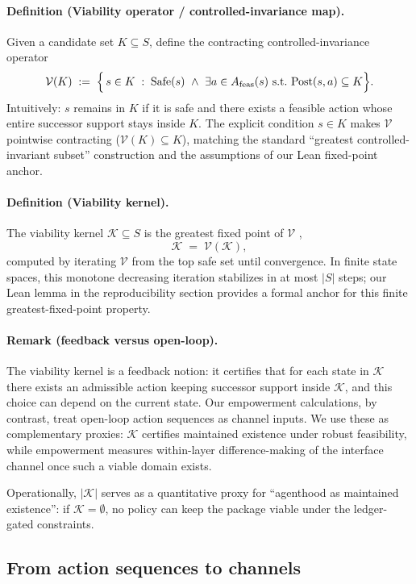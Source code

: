 \documentclass[11pt]{article}
\newcommand{\K}{\mathcal{K}}
\begin{document}
\paragraph{Definition (Viability operator / controlled-invariance map).}
Given a candidate set $K\subseteq S$, define the contracting controlled-invariance operator
\[
\mathcal{V}(K) \;:=\; \Bigl\{\, s\in K \;:\; \mathrm{Safe}(s)\ \wedge\ \exists a\in A_{\mathrm{feas}}(s)\ \text{s.t.}\ \mathrm{Post}(s,a)\subseteq K \Bigr\}.
\]
Intuitively: $s$ remains in $K$ if it is safe and there exists a feasible action whose entire successor support stays inside $K$. The explicit condition $s\in K$ makes $\mathcal{V}$ pointwise contracting ($\mathcal{V}(K)\subseteq K$), matching the standard ``greatest controlled-invariant subset'' construction and the assumptions of our Lean fixed-point anchor.

\paragraph{Definition (Viability kernel).}
The viability kernel $\K\subseteq S$ is the greatest fixed point of $\mathcal{V}$ \citep{aubin1991,tarski1955},
\[
\K \;=\; \mathcal{V}(\K),
\]
computed by iterating $\mathcal{V}$ from the top safe set until convergence. In finite state spaces, this monotone decreasing iteration stabilizes in at most $|S|$ steps; our Lean lemma in the reproducibility section provides a formal anchor for this finite greatest-fixed-point property.

\paragraph{Remark (feedback versus open-loop).}
The viability kernel is a feedback notion: it certifies that for each state in $\K$ there exists an admissible action keeping successor support inside $\K$, and this choice can depend on the current state. Our empowerment calculations, by contrast, treat open-loop action sequences as channel inputs. We use these as complementary proxies: $\K$ certifies maintained existence under robust feasibility, while empowerment measures within-layer difference-making of the interface channel once such a viable domain exists.

Operationally, $|\K|$ serves as a quantitative proxy for ``agenthood as maintained existence'': if $\K=\emptyset$, no policy can keep the package viable under the ledger-gated constraints.

\subsection{From action sequences to channels}
\end{document}
